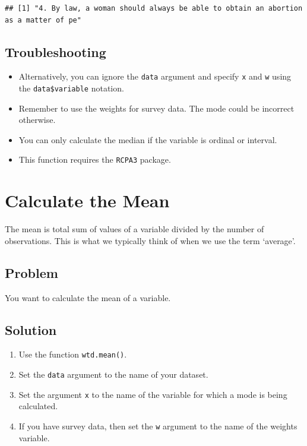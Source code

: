 \documentclass[
]{book}
\providecommand{\tightlist}{%
  \setlength{\itemsep}{0pt}\setlength{\parskip}{0pt}}
\begin{document}
\begin{verbatim}
## [1] "4. By law, a woman should always be able to obtain an abortion as a matter of pe"
\end{verbatim}

\hypertarget{troubleshooting-28}{%
\subsection{Troubleshooting}\label{troubleshooting-28}}

\begin{itemize}
\tightlist
\item
  Alternatively, you can ignore the \texttt{data} argument and specify \texttt{x} and \texttt{w} using the \texttt{data\$variable} notation.
\item
  Remember to use the weights for survey data. The mode could be incorrect otherwise.
\item
  You can only calculate the median if the variable is ordinal or interval.
\item
  This function requires the \texttt{RCPA3} package.
\end{itemize}

\hypertarget{mean}{%
\section{Calculate the Mean}\label{mean}}

The mean is total sum of values of a variable divided by the number of observations. This is what we typically think of when we use the term `average'.

\hypertarget{problem-33}{%
\subsection{Problem}\label{problem-33}}

You want to calculate the mean of a variable.

\hypertarget{solution-32}{%
\subsection{Solution}\label{solution-32}}

\begin{enumerate}
\def\labelenumi{\arabic{enumi}.}
\tightlist
\item
  Use the function \texttt{wtd.mean()}.
\item
  Set the \texttt{data} argument to the name of your dataset.
\item
  Set the argument \texttt{x} to the name of the variable for which a mode is being calculated.
\item
  If you have survey data, then set the \texttt{w} argument to the name of the weights variable.
\end{enumerate}
\end{document}
